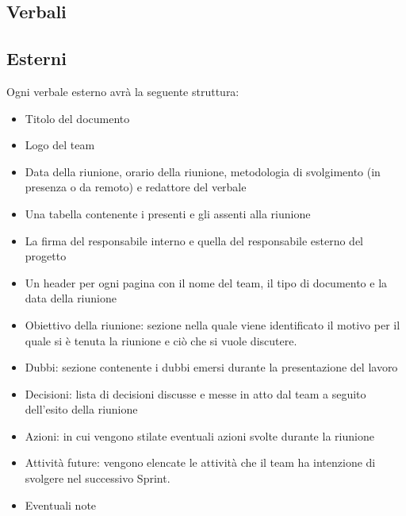 \documentclass{article}
\begin{document}
\subsection{Verbali}
\subsection*{Esterni}
Ogni verbale esterno avrà la seguente struttura:
\begin{itemize}
    \item Titolo del documento
    \item Logo del team
    \item Data della riunione, orario della riunione, metodologia di svolgimento (in presenza o da remoto) e redattore del verbale
    \item Una tabella contenente i presenti e gli assenti alla riunione
    \item La firma del responsabile interno e quella del responsabile esterno del progetto
    \item Un header per ogni pagina con il nome del team, il tipo di documento e la data della riunione
    \item Obiettivo della riunione: sezione nella quale viene identificato il motivo per il quale si è tenuta la riunione e ciò che si vuole discutere. 
    \item Dubbi: sezione contenente i dubbi emersi durante la presentazione del lavoro
    \item Decisioni: lista di decisioni discusse e messe in atto dal team a seguito dell'esito della riunione
    \item Azioni: in cui vengono stilate eventuali azioni svolte durante la riunione
    \item Attività future: vengono elencate le attività che il team ha intenzione di svolgere nel successivo Sprint. 
    \item Eventuali note
\end{itemize}
\end{document}
